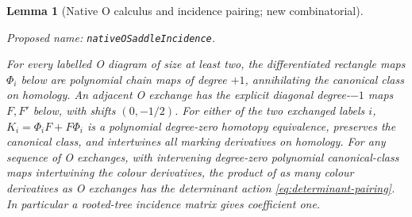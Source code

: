 \documentclass[11pt,a4paper]{article}
\newtheorem{lemma}[theorem]{Lemma}
\theoremstyle{remark}
\newcommand{\formalname}[1]{\leavevmode\par\noindent\textnormal{\small Proposed name: \texttt{#1}.}\par\smallskip}
\begin{document}
\begin{lemma}[Native O calculus and incidence pairing; new combinatorial]
\label{lem:O-calculus}
\formalname{nativeOSaddleIncidence}
For every labelled O diagram of size at least two, the differentiated
rectangle maps $\Phi_i$ below are polynomial chain maps of degree
$+1$, annihilating the canonical class on homology.  An adjacent O
exchange has the explicit diagonal degree-$-1$ maps $F,F'$ below,
with shifts $(0,-1/2)$.  For either of the two exchanged labels $i$,
$K_i=\Phi_iF+F\Phi_i$ is a polynomial degree-zero homotopy equivalence,
preserves the canonical class, and intertwines all marking
derivatives on homology.  For any sequence of O exchanges, with
intervening degree-zero polynomial canonical-class maps intertwining
the colour derivatives, the product of as many colour derivatives
as O exchanges has the determinant action
\eqref{eq:determinant-pairing}.  In particular a rooted-tree incidence
matrix gives coefficient one.
\end{lemma}
\end{document}
